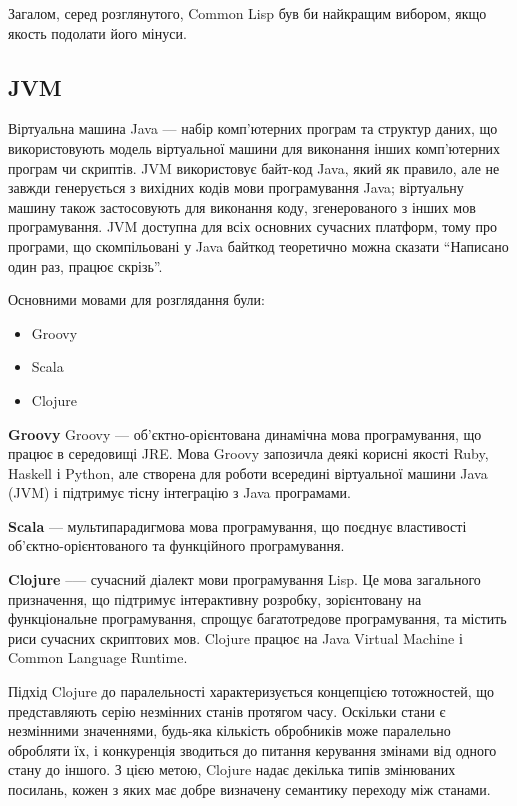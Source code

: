 Загалом, серед розглянутого, Common Lisp був би найкращим вибором, якщо якость подолати його мінуси.
\subsection{JVM}
Віртуальна машина Java --- набір комп'ютерних програм та структур даних, що використовують модель віртуальної машини для виконання інших комп'ютерних програм чи скриптів. JVM використовує байт-код Java, який як правило, але не завжди генерується з вихідних кодів мови програмування Java; віртуальну машину також застосовують для виконання коду, згенерованого з інших мов програмування. JVM доступна для всіх основних сучасних платформ, тому про програми, що скомпільовані у Java байткод теоретично можна сказати ``Написано один раз, працює скрізь''.

Основними мовами для розглядання були:
\begin{itemize}
	\item Groovy
	\item Scala
	\item Clojure
\end{itemize}

\textbf{Groovy}
Groovy — об'єктно-орієнтована динамічна мова програмування, що працює в середовищі JRE. Мова Groovy запозичла деякі корисні якості Ruby, Haskell і Python, але створена для роботи всередині віртуальної машини Java (JVM) і підтримує тісну інтеграцію з Java програмами.

\textbf{Scala} --- мультипарадигмова мова програмування, що поєднує властивості об'єктно-орієнтованого та функційного програмування.

\textbf{Clojure} --— сучасний діалект мови програмування Lisp. Це мова загального призначення, що підтримує інтерактивну розробку, зорієнтовану на функціональне програмування, спрощує багатотредове програмування, та містить риси сучасних скриптових мов. Clojure працює на Java Virtual Machine і Common Language Runtime.


Підхід Clojure до паралельності характеризується концепцією тотожностей, що представляють серію незмінних станів протягом часу. Оскільки стани є незмінними значеннями, будь-яка кількість обробників може паралельно обробляти їх, і конкуренція зводиться до питання керування змінами від одного стану до іншого. З цією метою, Clojure надає декілька типів змінюваних посилань, кожен з яких має добре визначену семантику переходу між станами.
